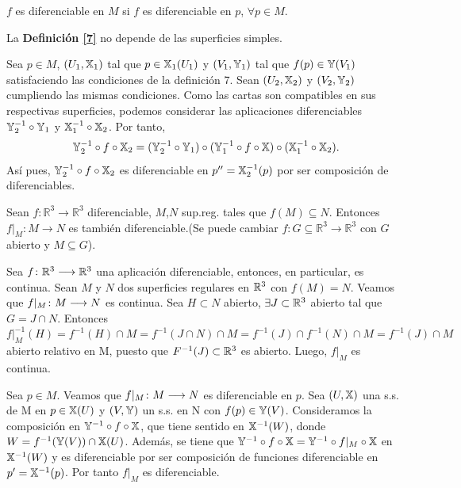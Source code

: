 \documentclass[twoside]{report}
\begin{document}
\begin{nota}
$f$ es diferenciable en $M$ si $f$ es diferenciable en $p$, $\forall p \in M$.
\end{nota}

\begin{prop}
La \textup{\textbf{Definición \ref{7}}} no depende de las superficies simples.
\end{prop}
\begin{dem}
Sea $p\in M$, $(U_1,\mathbb{X}_1)$ tal que $p\in\mathbb{X}_1(U_1)$ y $(V_1,\mathbb{Y}_1)$ tal que $f(p)\in\mathbb{Y}(V_1)$ satisfaciendo las condiciones de la definición 7. Sean  $(U_2,\mathbb{X}_2)$ y $(V_2,\mathbb{Y}_2)$ cumpliendo las mismas condiciones. Como las cartas son compatibles en sus respectivas superficies, podemos considerar las aplicaciones diferenciables $\mathbb{Y}_2^{-1}\circ \mathbb{Y}_1$ y $\mathbb{X}_1^{-1}\circ \mathbb{X}_2$. Por tanto, $$\mathbb{Y}_2^{-1}\circ f\circ \mathbb{X}_2=(\mathbb{Y}_2^{-1}\circ \mathbb{Y}_1)\circ (\mathbb{Y}_1^{-1}\circ f\circ\mathbb{X})\circ(\mathbb{X}_1^{-1}\circ \mathbb{X}_2).$$
Así pues, $\mathbb{Y}_2^{-1}\circ f\circ \mathbb{X}_2$ es diferenciable en $p''=\mathbb{X}_2^{-1}(p)$ por ser composición de diferenciables.\QED
\end{dem}



\begin{teorema}
Sean  $f: \mathbb{R}^3 \rightarrow \mathbb{R}^3$ diferenciable, $M$,$N$ sup.reg. tales que $f(M) \subseteq N$. Entonces $f\vert_M : M \rightarrow N$ es también diferenciable.(Se puede cambiar $f: G \subseteq \mathbb{R}^3 \rightarrow \mathbb{R}^3$ con $G$ abierto y $M\subseteq G$).
\end{teorema}

\begin{dem} Sea $f\colon{\mathbb{R}^3}\longrightarrow{\mathbb{R}^3}$ una aplicación diferenciable, entonces, en particular, es continua. Sean $M$ y $N$ dos superficies regulares en $\mathbb{R}^3$ con $f(M)=N$. Veamos que $f|_M\colon{M}\longrightarrow{N}$ es continua. Sea $H\subset N$ abierto, $\exists J\subset \mathbb{R}^3$ abierto tal que $G=J\cap N$. Entonces $f|_M^{-1}(H) = f^{-1}(H)\cap M = f^{-1}(J\cap N)\cap M=f^{-1}(J)\cap f^{-1}(N)\cap M = f^{-1}(J)\cap M$ abierto relativo en M, puesto que $F^{-1}(J)\subset \mathbb{R}^3$ es abierto. Luego, $f|_M$ es continua.

Sea $p\in M$. Veamos que $f|_M\colon{M}\longrightarrow{N}$ es diferenciable en $p$. Sea $(U,\mathbb{X})$ una s.s. de M en $p\in\mathbb{X}(U)$ y $(V,\mathbb{Y})$ un s.s. en N con $f(p)\in\mathbb{Y}(V)$. Consideramos la composición en $\mathbb{Y}^{-1}\circ f \circ \mathbb{X}$, que tiene sentido en $\mathbb{X}^{-1}(W)$, donde $W = f^{-1}(\mathbb{Y}(V))\cap \mathbb{X}(U)$. Además, se tiene que $\mathbb{Y}^{-1}\circ f \circ \mathbb{X} = \mathbb{Y}^{-1}\circ f|_M \circ \mathbb{X}$ en $\mathbb{X}^{-1}(W)$ y es diferenciable por ser composición de funciones diferenciable en $p'=\mathbb{X}^{-1}(p)$. Por tanto $f|_M$ es diferenciable.\QED
\end{dem}
\end{document}
